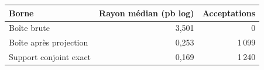 \begin{tabularx}{\linewidth}{@{}Yrr@{}}
\toprule
Borne & Rayon médian (pb log) & Acceptations\\
\midrule
Boîte brute & 3,501 & 0\\
Boîte après projection & 0,253 & 1\,099\\
Support conjoint exact & 0,169 & 1\,240\\
\bottomrule
\end{tabularx}
